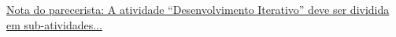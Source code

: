 \documentclass[
	12pt,				%
	openright,			%
	oneside,			%
	a4paper,			%
	chapter=TITLE,		%
	english,			%
	french,				%
	spanish,			%
	brazil				%
	]{abntex2}
\begin{document}
{\underline{Nota do parecerista: A atividade ``Desenvolvimento Iterativo'' deve ser dividida em sub-atividades...}

















}
\end{document}
